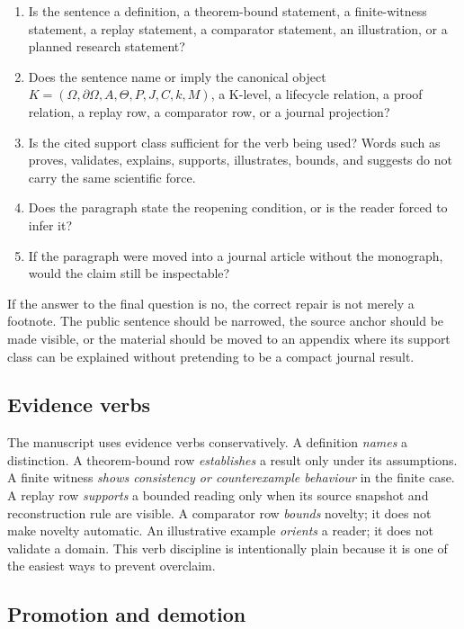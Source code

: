 \begin{enumerate}
\item Is the sentence a definition, a theorem-bound statement, a finite-witness
      statement, a replay statement, a comparator statement, an illustration,
      or a planned research statement?
\item Does the sentence name or imply the canonical object
      \(K=(\Omega,\partial\Omega,A,\Theta,P,J,C,k,M)\), a K-level, a lifecycle
      relation, a proof relation, a replay row, a comparator row, or a journal
      projection?
\item Is the cited support class sufficient for the verb being used? Words such
      as proves, validates, explains, supports, illustrates, bounds, and
      suggests do not carry the same scientific force.
\item Does the paragraph state the reopening condition, or is the reader forced
      to infer it?
\item If the paragraph were moved into a journal article without the monograph,
      would the claim still be inspectable?
\end{enumerate}

If the answer to the final question is no, the correct repair is not merely a
footnote. The public sentence should be narrowed, the source anchor should be
made visible, or the material should be moved to an appendix where its support
class can be explained without pretending to be a compact journal result.

\subsection{Evidence verbs}

The manuscript uses evidence verbs conservatively. A definition \emph{names} a
distinction. A theorem-bound row \emph{establishes} a result only under its
assumptions. A finite witness \emph{shows consistency or counterexample
behaviour} in the finite case. A replay row \emph{supports} a bounded reading
only when its source snapshot and reconstruction rule are visible. A comparator
row \emph{bounds} novelty; it does not make novelty automatic. An illustrative
example \emph{orients} a reader; it does not validate a domain. This verb
discipline is intentionally plain because it is one of the easiest ways to
prevent overclaim.

\subsection{Promotion and demotion}

